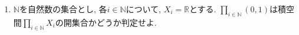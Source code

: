 \documentclass[dvipdfmx,a4paper,11pt]{article}
\newcommand{\R}{\mathbb{R}}
\newcommand{\N}{\mathbb{N}}
\theoremstyle{definition}
\begin{document}
\begin{enumerate}[ label=\textbf{問}5.\arabic*]





\item $\N$を自然数の集合とし, 各$i \in \N$について, $X_{i} =\R $とする. %
$\prod_{i \in \N} (0,1)$は積空間$\prod_{i \in \N} X_{i}$の開集合かどうか判定せよ.
	


\end{enumerate}
\end{document}

